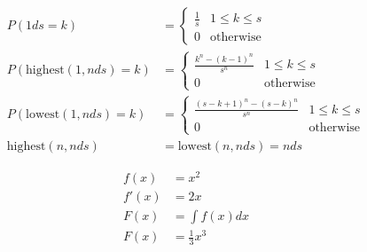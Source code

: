\documentclass{article}
\begin{document}
\begin{align}
    P\left(1ds=k\right)                               & = \begin{cases}
                                                              \frac{1}{s} & 1\leq k\leq s    \\
                                                              0           & \text{otherwise}
                                                          \end{cases}                                         \\
    P\left(\text{highest}\left(1, nds\right)=k\right) & = \begin{cases}
                                                              \frac{k^n-\left(k-1\right)^n}{s^n} & 1\leq k\leq s    \\
                                                              0                                  & \text{otherwise}
                                                          \end{cases}                  \\
    P\left(\text{lowest}\left(1, nds\right)=k\right)  & = \begin{cases}
                                                              \frac{\left(s-k+1\right)^n-\left(s-k\right)^n}{s^n} & 1\leq k\leq s    \\
                                                              0                                                   & \text{otherwise}
                                                          \end{cases} \\
    \text{highest}\left(n, nds\right)                 & = \text{lowest}\left(n, nds\right) = nds
\end{align}

\begin{align}
    f(x)  & = x^2            \\
    f'(x) & = 2x             \\
    F(x)  & = \int f(x)dx    \\
    F(x)  & = \frac{1}{3}x^3
\end{align}
\end{document}
